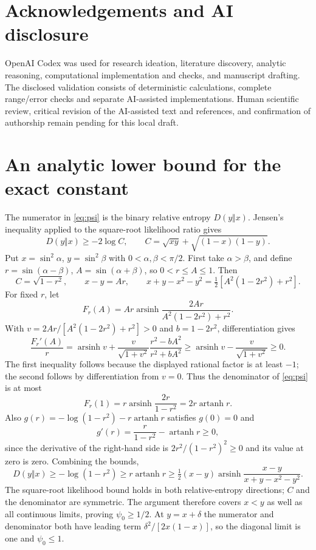 \documentclass[11pt,a4paper]{article}
\newcommand{\asinh}{\operatorname{arsinh}}
\newcommand{\atanh}{\operatorname{artanh}}
\newcommand{\KL}{D}
\begin{document}
\section*{Acknowledgements and AI disclosure}
OpenAI Codex was used for research ideation, literature discovery, analytic
reasoning, computational implementation and checks, and manuscript drafting.
The disclosed validation consists of deterministic calculations, complete
range/error checks and separate AI-assisted implementations. Human
scientific review, critical revision of the AI-assisted text and references,
and confirmation of authorship remain pending for this local draft.

\appendix
\section{An analytic lower bound for the exact constant}
\label{app:psi}

The numerator in \eqref{eq:psi} is the binary relative entropy
$\KL(y\Vert x)$. Jensen's inequality applied to the square-root likelihood
ratio gives
\begin{equation}
 \KL(y\Vert x)\ge-2\log C,\qquad
 C=\sqrt{xy}+\sqrt{(1-x)(1-y)}.
\end{equation}
Put $x=\sin^2\alpha$, $y=\sin^2\beta$ with
$0<\alpha,\beta<\pi/2$. First take $\alpha>\beta$, and define
$r=\sin(\alpha-\beta)$, $A=\sin(\alpha+\beta)$, so $0<r\le A\le1$.
Then
\begin{equation}
 C=\sqrt{1-r^2},\qquad x-y=Ar,\qquad
 x+y-x^2-y^2=\tfrac12[A^2(1-2r^2)+r^2].
\end{equation}
For fixed $r$, let
\begin{equation}
 F_r(A)=Ar\asinh\frac{2Ar}{A^2(1-2r^2)+r^2}.
\end{equation}
With $v=2Ar/[A^2(1-2r^2)+r^2]>0$ and $b=1-2r^2$, differentiation gives
\begin{equation}
 \frac{F_r'(A)}r=\asinh v+\frac{v}{\sqrt{1+v^2}}
 \frac{r^2-bA^2}{r^2+bA^2}
 \ge\asinh v-\frac{v}{\sqrt{1+v^2}}\ge0.
\end{equation}
The first inequality follows because the displayed rational factor is at
least $-1$; the second follows by differentiation from $v=0$.
Thus the denominator of \eqref{eq:psi} is at most
\begin{equation}
 F_r(1)=r\asinh\frac{2r}{1-r^2}=2r\atanh r.
\end{equation}
Also $g(r)=-\log(1-r^2)-r\atanh r$ satisfies $g(0)=0$ and
\begin{equation}
 g'(r)=\frac r{1-r^2}-\atanh r\ge0,
\end{equation}
since the derivative of the right-hand side is
$2r^2/(1-r^2)^2\ge0$ and its value at zero is zero. Combining the bounds,
\begin{equation}
 \KL(y\Vert x)\ge-\log(1-r^2)\ge r\atanh r
 \ge\tfrac12(x-y)\asinh\frac{x-y}{x+y-x^2-y^2}.
\end{equation}
The square-root likelihood bound holds in both relative-entropy directions;
$C$ and the denominator are symmetric. The argument therefore covers
$x<y$ as well as all continuous limits, proving $\psi_0\ge1/2$.
At $y=x+\delta$ the numerator and denominator both have leading term
$\delta^2/[2x(1-x)]$, so the diagonal limit is one and $\psi_0\le1$.
\end{document}
